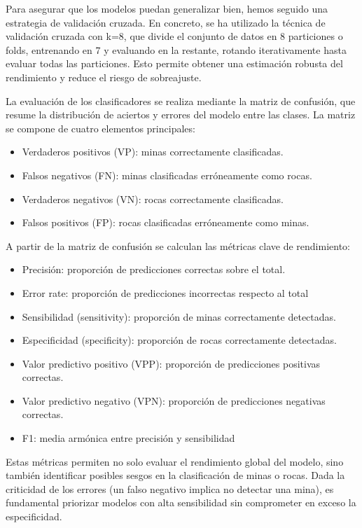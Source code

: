 \documentclass[a4paper,10pt]{article}
\begin{document}
    Para asegurar que los modelos puedan generalizar bien, hemos seguido una estrategia de validación cruzada. En concreto, se ha utilizado la técnica de validación cruzada con k=8, que divide el conjunto de datos en 8 particiones o folds, entrenando en 7 y evaluando en la restante, rotando iterativamente hasta evaluar todas las particiones. Esto permite obtener una estimación robusta del rendimiento y reduce el riesgo de sobreajuste.
    
    La evaluación de los clasificadores se realiza mediante la matriz de confusión, que resume la distribución de aciertos y errores del modelo entre las clases. La matriz se compone de cuatro elementos principales:
    \begin{itemize}
    \item Verdaderos positivos (VP): minas correctamente clasificadas.
    \item Falsos negativos (FN): minas clasificadas erróneamente como rocas.
    \item Verdaderos negativos (VN): rocas correctamente clasificadas.
    \item Falsos positivos (FP): rocas clasificadas erróneamente como minas.
    \end{itemize}
    
    \noindent A partir de la matriz de confusión se calculan las métricas clave de rendimiento:
    
    \begin{itemize}
    \item Precisión: proporción de predicciones correctas sobre el total.
    \item Error rate: proporción de predicciones incorrectas respecto al total
    \item Sensibilidad (sensitivity): proporción de minas correctamente detectadas.
    \item Especificidad (specificity): proporción de rocas correctamente detectadas.
    \item Valor predictivo positivo (VPP): proporción de predicciones positivas correctas.
    \item Valor predictivo negativo (VPN): proporción de predicciones negativas correctas.
    \item F1: media armónica entre precisión y sensibilidad 
    \end{itemize}
    
    Estas métricas permiten no solo evaluar el rendimiento global del modelo, sino también identificar posibles sesgos en la clasificación de minas o rocas. Dada la criticidad de los errores (un falso negativo implica no detectar una mina), es fundamental priorizar modelos con alta sensibilidad sin comprometer en exceso la especificidad.
    
\end{document}
